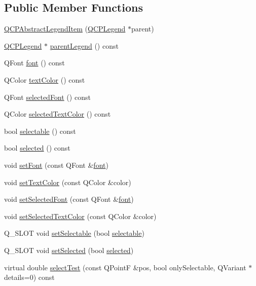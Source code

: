 \subsection*{Public Member Functions}
\begin{DoxyCompactItemize}
\item 
\hyperlink{classQCPAbstractLegendItem_afaff87610e8da0fa238ecf552872d774}{Q\+C\+P\+Abstract\+Legend\+Item} (\hyperlink{classQCPLegend}{Q\+C\+P\+Legend} $\ast$parent)
\item 
\hyperlink{classQCPLegend}{Q\+C\+P\+Legend} $\ast$ \hyperlink{classQCPAbstractLegendItem_afcd683e43058f99a47d6546eedffc5c1}{parent\+Legend} () const 
\item 
Q\+Font \hyperlink{classQCPAbstractLegendItem_ae476404706638d84fadc01021df2b19e}{font} () const 
\item 
Q\+Color \hyperlink{classQCPAbstractLegendItem_a444caef8565ac8d8653269f14d82b42d}{text\+Color} () const 
\item 
Q\+Font \hyperlink{classQCPAbstractLegendItem_afccfe665eb8483cec924a9c0a53ddf2b}{selected\+Font} () const 
\item 
Q\+Color \hyperlink{classQCPAbstractLegendItem_a076db1717257b82875b12a15ecf99ba3}{selected\+Text\+Color} () const 
\item 
bool \hyperlink{classQCPAbstractLegendItem_a0a0205f33f37edae50826c24cb8f1983}{selectable} () const 
\item 
bool \hyperlink{classQCPAbstractLegendItem_ac776e68e3367704452131c6aa9908bb9}{selected} () const 
\item 
void \hyperlink{classQCPAbstractLegendItem_a409c53455d8112f71d70c0c43eb10265}{set\+Font} (const Q\+Font \&\hyperlink{classQCPAbstractLegendItem_ae476404706638d84fadc01021df2b19e}{font})
\item 
void \hyperlink{classQCPAbstractLegendItem_a6ebace6aaffaedcdab2d74e88acc2d1e}{set\+Text\+Color} (const Q\+Color \&color)
\item 
void \hyperlink{classQCPAbstractLegendItem_a91db5aee48617a9d3206e61376807365}{set\+Selected\+Font} (const Q\+Font \&\hyperlink{classQCPAbstractLegendItem_ae476404706638d84fadc01021df2b19e}{font})
\item 
void \hyperlink{classQCPAbstractLegendItem_a4d01d008ee1a5bfe9905b0397a421936}{set\+Selected\+Text\+Color} (const Q\+Color \&color)
\item 
Q\+\_\+\+S\+L\+OT void \hyperlink{classQCPAbstractLegendItem_a9913ef48730551b696e7f98a2391c599}{set\+Selectable} (bool \hyperlink{classQCPAbstractLegendItem_a0a0205f33f37edae50826c24cb8f1983}{selectable})
\item 
Q\+\_\+\+S\+L\+OT void \hyperlink{classQCPAbstractLegendItem_a6eed93b0ab99cb3eabb043fb08179c2b}{set\+Selected} (bool \hyperlink{classQCPAbstractLegendItem_ac776e68e3367704452131c6aa9908bb9}{selected})
\item 
virtual double \hyperlink{classQCPAbstractLegendItem_ad0480d5cad34627a294a2921caa4a62f}{select\+Test} (const Q\+PointF \&pos, bool only\+Selectable, Q\+Variant $\ast$details=0) const 
\end{DoxyCompactItemize}
